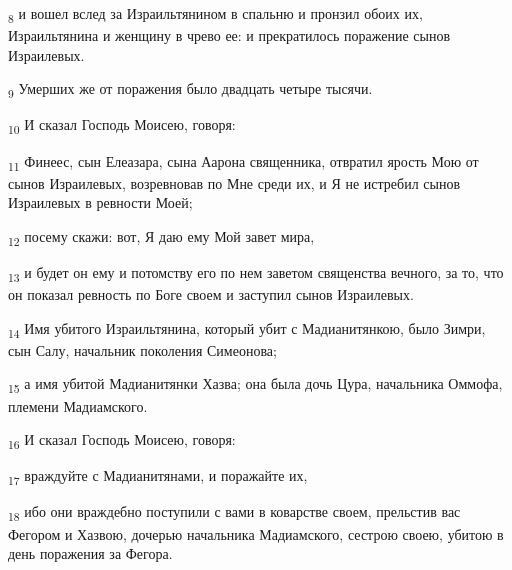 \begin{tcolorbox}
\textsubscript{8} и вошел вслед за Израильтянином в спальню и пронзил обоих их, Израильтянина и женщину в чрево ее: и прекратилось поражение сынов Израилевых.
\end{tcolorbox}
\begin{tcolorbox}
\textsubscript{9} Умерших же от поражения было двадцать четыре тысячи.
\end{tcolorbox}
\begin{tcolorbox}
\textsubscript{10} И сказал Господь Моисею, говоря:
\end{tcolorbox}
\begin{tcolorbox}
\textsubscript{11} Финеес, сын Елеазара, сына Аарона священника, отвратил ярость Мою от сынов Израилевых, возревновав по Мне среди их, и Я не истребил сынов Израилевых в ревности Моей;
\end{tcolorbox}
\begin{tcolorbox}
\textsubscript{12} посему скажи: вот, Я даю ему Мой завет мира,
\end{tcolorbox}
\begin{tcolorbox}
\textsubscript{13} и будет он ему и потомству его по нем заветом священства вечного, за то, что он показал ревность по Боге своем и заступил сынов Израилевых.
\end{tcolorbox}
\begin{tcolorbox}
\textsubscript{14} Имя убитого Израильтянина, который убит с Мадианитянкою, было Зимри, сын Салу, начальник поколения Симеонова;
\end{tcolorbox}
\begin{tcolorbox}
\textsubscript{15} а имя убитой Мадианитянки Хазва; она была дочь Цура, начальника Оммофа, племени Мадиамского.
\end{tcolorbox}
\begin{tcolorbox}
\textsubscript{16} И сказал Господь Моисею, говоря:
\end{tcolorbox}
\begin{tcolorbox}
\textsubscript{17} враждуйте с Мадианитянами, и поражайте их,
\end{tcolorbox}
\begin{tcolorbox}
\textsubscript{18} ибо они враждебно поступили с вами в коварстве своем, прельстив вас Фегором и Хазвою, дочерью начальника Мадиамского, сестрою своею, убитою в день поражения за Фегора.
\end{tcolorbox}
